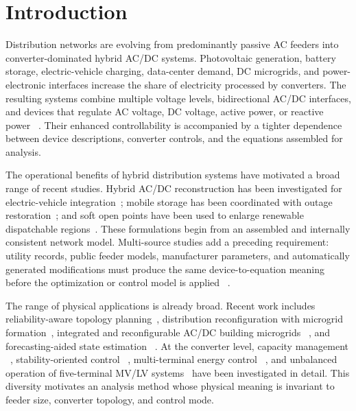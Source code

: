 \documentclass[final,5p,times,twocolumn]{elsarticle}
\begin{document}
\section{Introduction}\label{sec:introduction}

Distribution networks are evolving from predominantly passive AC feeders into
converter-dominated hybrid AC/DC systems. Photovoltaic generation, battery
storage, electric-vehicle charging, data-center demand, DC microgrids, and
power-electronic interfaces increase the share of electricity processed by
converters. The resulting systems combine multiple voltage levels,
bidirectional AC/DC interfaces, and devices that regulate AC voltage, DC
voltage, active power, or reactive power
~\cite{abdelwanis2024review,nasir2025rlreview,xiao2022five}. Their enhanced
controllability is accompanied by a tighter dependence between device
descriptions, converter controls, and the equations assembled for analysis.

The operational benefits of hybrid distribution systems have motivated a broad
range of recent studies. Hybrid AC/DC reconstruction has been investigated for
electric-vehicle integration~\cite{yu2023ev}; mobile storage has been coordinated
with outage restoration~\cite{zhang2023outage}; and soft open points have been
used to enlarge renewable dispatchable regions~\cite{li2024dispatchable}.
These formulations begin from an assembled and internally consistent network
model. Multi-source studies add a preceding requirement: utility records,
public feeder models, manufacturer parameters, and automatically generated
modifications must produce the same device-to-equation meaning before the
optimization or control model is applied
~\cite{liang2010validation,ravikumar2017cim}.

The range of physical applications is already broad. Recent work includes
reliability-aware topology planning~\cite{wang2022planning}, distribution
reconfiguration with microgrid formation~\cite{wu2022reconfiguration},
integrated and reconfigurable AC/DC building microgrids
~\cite{yu2020architecture}, and forecasting-aided state estimation
~\cite{huang2022state}. At the converter level, capacity management
~\cite{heidari2022capacity}, stability-oriented control
~\cite{khosravi2023stability}, multi-terminal energy control
~\cite{xiao2021multiterminal}, and unbalanced operation of five-terminal
MV/LV systems~\cite{xiao2022five} have been investigated in detail. This
diversity motivates an analysis method whose physical meaning is invariant to
feeder size, converter topology, and control mode.
\end{document}
